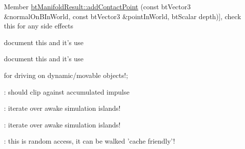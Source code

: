\begin{DoxyRefList}
Member \hyperlink{classbt_manifold_result_aebe32f0c202d988d0458e88d768602c6}{bt\+Manifold\+Result\+:\+:add\+Contact\+Point} (const bt\+Vector3 \&normal\+On\+B\+In\+World, const bt\+Vector3 \&point\+In\+World, bt\+Scalar depth)], check this for any side effects  
\item[\label{todo__todo000050}%
\hypertarget{todo__todo000050}{}%
Member \hyperlink{classbt_quaternion_adeda27273475435a9e3223abeea73992}{bt\+Quaternion\+:\+:farthest} (const \hyperlink{classbt_quaternion}{bt\+Quaternion} \&qd) const ]document this and it's use  
\item[\label{todo__todo000051}%
\hypertarget{todo__todo000051}{}%
Member \hyperlink{classbt_quaternion_a821a38604c6333b95d954867315d8716}{bt\+Quaternion\+:\+:nearest} (const \hyperlink{classbt_quaternion}{bt\+Quaternion} \&qd) const ]document this and it's use  
\item[\label{todo__todo000045}%
\hypertarget{todo__todo000045}{}%
Member \hyperlink{classbt_raycast_vehicle_a53451c4e3495561f3f078b2041ef04be}{bt\+Raycast\+Vehicle\+:\+:ray\+Cast} (\hyperlink{structbt_wheel_info}{bt\+Wheel\+Info} \&wheel)]for driving on dynamic/movable objects!;  
\item[\label{todo__todo000038}%
\hypertarget{todo__todo000038}{}%
Member \hyperlink{classbt_rotational_limit_motor_ad52e9b1c402c7bdd47fb1a9de28afb7e}{bt\+Rotational\+Limit\+Motor\+:\+:solve\+Angular\+Limits} (bt\+Scalar time\+Step, bt\+Vector3 \&axis, bt\+Scalar jac\+Diag\+A\+B\+Inv, \hyperlink{classbt_rigid_body}{bt\+Rigid\+Body} $\ast$body0, \hyperlink{classbt_rigid_body}{bt\+Rigid\+Body} $\ast$body1)]\+: should clip against accumulated impulse  
\item[\label{todo__todo000043}%
\hypertarget{todo__todo000043}{}%
Member \hyperlink{classbt_simple_dynamics_world_ac44c80444f4d6d4e3c2955dd43b7a93a}{bt\+Simple\+Dynamics\+World\+:\+:clear\+Forces} ()]\+: iterate over awake simulation islands!  
\item[\label{todo__todo000044}%
\hypertarget{todo__todo000044}{}%
Member \hyperlink{classbt_simple_dynamics_world_a91e996f5ce6e465e805565ee0ba14824}{bt\+Simple\+Dynamics\+World\+:\+:synchronize\+Motion\+States} ()]\+: iterate over awake simulation islands!  
\item[\label{todo__todo000027}%
\hypertarget{todo__todo000027}{}%
Member \hyperlink{classbt_simulation_island_manager_ab0f52dc46bc01c6754f4cb32ba26c99a}{bt\+Simulation\+Island\+Manager\+:\+:build\+And\+Process\+Islands} (\hyperlink{classbt_dispatcher}{bt\+Dispatcher} $\ast$dispatcher, \hyperlink{classbt_collision_world}{bt\+Collision\+World} $\ast$collision\+World, Island\+Callback $\ast$callback)]\+: this is random access, it can be walked 'cache friendly'!  

\end{DoxyRefList}
